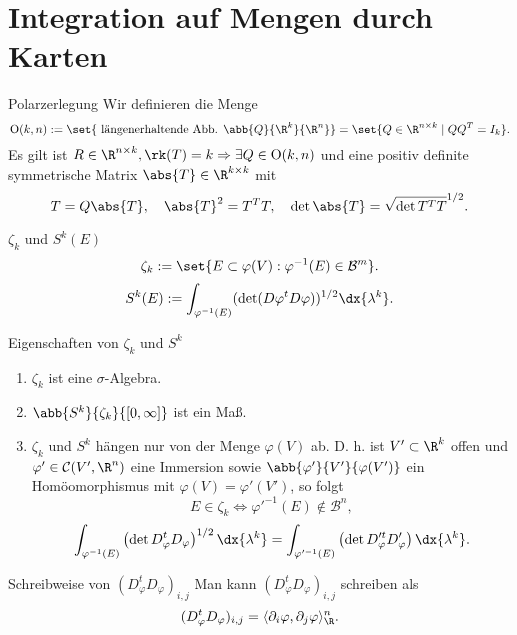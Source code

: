 \section*{Integration auf Mengen durch Karten}

\begin{karte}{Polarzerlegung}
    Wir definieren die Menge 
    \[ \mathrm{O}(k,n) := \set{\text{ längenerhaltende Abb. } \abb{Q}{\R^k}{\R^n}}
    = \set{ Q \in \R^{n\times k} \;|\; QQ^T = I_k }. \]
    Es gilt ist \(R \in \R^{n\times k}, \rk(T) = k \Rightarrow 
    \exists Q\in\mathrm{O}(k,n) \) und eine positiv definite symmetrische Matrix 
    \( \abs{T} \in \R^{k\times k} \) mit 
    \[ T = Q\abs{T}, \quad \abs{T}^2 = T^T T, \quad \det \abs{T} = \sqrt{\det T^T T}^{1/2}. \]
\end{karte}

\begin{karte}{\( \zeta_k \) und \(S^k(E)\)}
    \[ \zeta_k := \set{ E \subset \varphi(V): \varphi^{-1}(E) \in \mathcal{B}^m }. \]
    \[ S^k(E) := \int_{\varphi^{-1}(E)} (\det(D\varphi^t D\varphi))^{1/2} \dx{\lambda^k}. \]
\end{karte}

\begin{karte}{Eigenschaften von \( \zeta_k \) und \(S^k\)}
    \begin{enumerate}
        \item \( \zeta_k \) ist eine \(\sigma\)-Algebra.
        \item \( \abb{S^k}{\zeta_k}{[0,\infty]} \) ist ein Maß.
        \item \( \zeta_k \) und \(S^k\) hängen nur von der Menge \( \varphi(V) \) ab. 
        D. h. ist \(V' \subset \R^k\) offen und \( \varphi'\in \mathcal{C}(V', \R^n) \) 
        eine Immersion sowie \( \abb{\varphi'}{V'}{\varphi(V')} \) 
        ein Homöomorphismus mit \(\varphi(V) = \varphi'(V')\), so folgt 
        \[ E \in \zeta_k \Leftrightarrow \varphi'^{-1}(E) \notin \mathcal{B}^n, \]
        \[ \int_{\varphi^{-1}(E)} \left(\det D^t_\varphi D_\varphi\right)^{1/2} \dx{\lambda^k} 
        = \int_{\varphi'^{-1}(E)} \left( \det D'^t_\varphi D'_\varphi \right) \dx{\lambda^k}. \]
    \end{enumerate}
\end{karte}

\begin{karte}{Schreibweise von \( (D^t_\varphi D_\varphi)_{i,j} \)}
    Man kann \( (D^t_\varphi D_\varphi)_{i,j} \) schreiben als 
    \[ (D^t_\varphi D_\varphi)_{i,j} = \langle \partial_i \varphi, \partial_j \varphi \rangle_\R^n. \]
\end{karte}